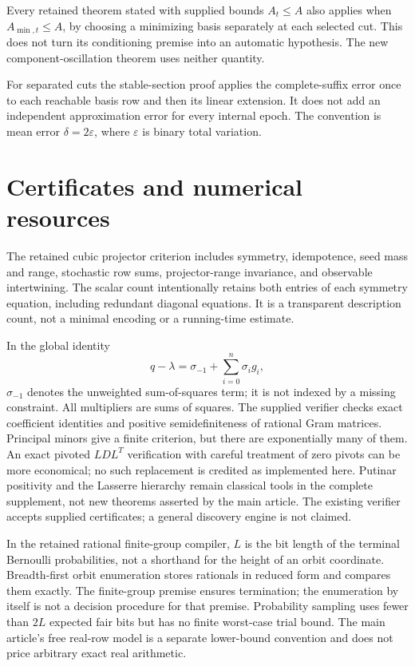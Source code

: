 \documentclass[11pt]{amsart}
\numberwithin{equation}{section}
\begin{document}
Every retained theorem stated with supplied bounds $A_t\le A$ also applies when $A_{\min,t}\le A$, by choosing a minimizing basis separately at each selected cut. This does not turn its conditioning premise into an automatic hypothesis. The new component-oscillation theorem uses neither quantity.

For separated cuts the stable-section proof applies the complete-suffix error once to each reachable basis row and then its linear extension. It does not add an independent approximation error for every internal epoch. The convention is mean error $\delta=2\varepsilon$, where $\varepsilon$ is binary total variation.

\section{Certificates and numerical resources}
The retained cubic projector criterion includes symmetry, idempotence, seed mass and range, stochastic row sums, projector-range invariance, and observable intertwining. The scalar count intentionally retains both entries of each symmetry equation, including redundant diagonal equations. It is a transparent description count, not a minimal encoding or a running-time estimate.

In the global identity
\[
 q-\lambda=\sigma_{-1}+\sum_{i=0}^n\sigma_i g_i,
\]
$\sigma_{-1}$ denotes the unweighted sum-of-squares term; it is not indexed by a missing constraint. All multipliers are sums of squares. The supplied verifier checks exact coefficient identities and positive semidefiniteness of rational Gram matrices. Principal minors give a finite criterion, but there are exponentially many of them. An exact pivoted $LDL^T$ verification with careful treatment of zero pivots can be more economical; no such replacement is credited as implemented here. Putinar positivity and the Lasserre hierarchy remain classical tools in the complete supplement, not new theorems asserted by the main article. The existing verifier accepts supplied certificates; a general discovery engine is not claimed.

In the retained rational finite-group compiler, $L$ is the bit length of the terminal Bernoulli probabilities, not a shorthand for the height of an orbit coordinate. Breadth-first orbit enumeration stores rationals in reduced form and compares them exactly. The finite-group premise ensures termination; the enumeration by itself is not a decision procedure for that premise. Probability sampling uses fewer than $2L$ expected fair bits but has no finite worst-case trial bound. The main article's free real-row model is a separate lower-bound convention and does not price arbitrary exact real arithmetic.
\end{document}
